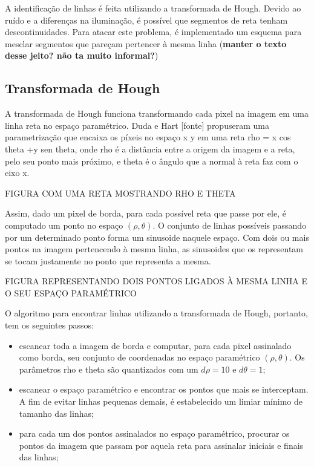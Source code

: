 A identificação de linhas é feita utilizando a transformada de Hough. Devido ao ruído e a diferenças na iluminação, é possível que segmentos de reta tenham descontinuidades. Para atacar este problema, é implementado um esquema para mesclar segmentos que pareçam pertencer à mesma linha (\textbf{manter o texto desse jeito? não ta muito informal?})

\subsection{Transformada de Hough}

A transformada de Hough funciona transformando cada pixel na imagem em uma linha reta no espaço paramétrico. Duda e Hart [fonte] propuseram uma parametrização que encaixa os píxeis no espaço x y em uma reta rho = x cos theta +y sen theta, onde rho é a distância entre a origem da imagem e a reta, pelo seu ponto mais próximo, e theta é o ângulo que a normal à reta faz com o eixo x.

FIGURA COM UMA RETA MOSTRANDO RHO E THETA

Assim, dado um pixel de borda, para cada possível reta que passe por ele, é computado um ponto no espaço $(\rho,\theta)$. O conjunto de linhas possíveis passando por um determinado ponto forma um sinusoide naquele espaço. Com dois ou mais pontos na imagem pertencendo à mesma linha, as sinusoides que os representam se tocam justamente no ponto que representa a mesma.

FIGURA REPRESENTANDO DOIS PONTOS LIGADOS À MESMA LINHA E O SEU ESPAÇO PARAMÉTRICO

O algoritmo para encontrar linhas utilizando a transformada de Hough, portanto, tem os seguintes passos: 
\begin{itemize}
\item escanear toda a imagem de borda e computar, para cada pixel assinalado como borda, seu conjunto de coordenadas no espaço paramétrico $(\rho,\theta)$. Os parâmetros rho e theta são quantizados com um $d\rho = 10$ e $d\theta = 1$;
\item escanear o espaço paramétrico e encontrar os pontos que mais se interceptam. A fim de evitar linhas pequenas demais, é estabelecido um limiar mínimo de tamanho das linhas;
\item para cada um dos pontos assinalados no espaço paramétrico, procurar os pontos da imagem que passam por aquela reta para assinalar iniciais e finais das linhas;
\end{itemize}

